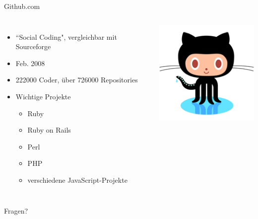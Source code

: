 \documentclass{beamer}
\begin{document}
\begin{frame}[<+->]{Github.com}
\begin{columns}
    \begin{itemize}
    \item ``Social Coding", vergleichbar mit Sourceforge
	\item Feb. 2008
	\item 222000 Coder, über 726000 Repositories
	\item Wichtige Projekte
	\begin{itemize}
	  \item Ruby
	  \item Ruby on Rails
	  \item Perl
	  \item PHP
	  \item verschiedene JavaScript-Projekte
	\end{itemize}
  \end{itemize}
	\includegraphics[scale=2]{./images/octocat.png}
  \end{columns}
\end{frame}

\begin{frame}
  \Huge{Fragen?}
\end{frame}
\end{document}
